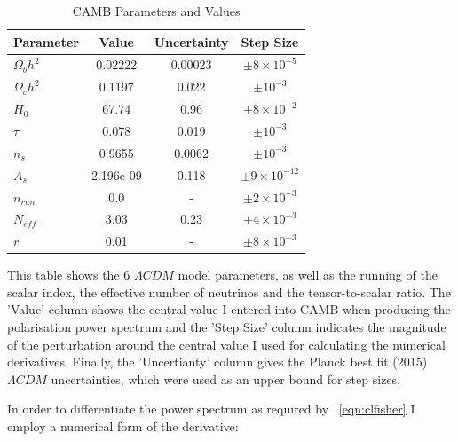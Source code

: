 \begin{table}[h]
\centering
\caption{CAMB Parameters and Values}
\label{table:camb}
\begin{tabular}{l|l|l|l}
Parameter & \multicolumn{1}{c|}{Value} & Uncertainty & Step Size \\ \hline
$\Omega_{b}h^{2}$ & \multicolumn{1}{c|}{0.02222} & \multicolumn{1}{c|}{0.00023} & \multicolumn{1}{c}{$\pm 8 \times 10^{-5}$}  \\
$\Omega_{c}h^{2}$ & \multicolumn{1}{c|}{0.1197} & \multicolumn{1}{c|}{0.022} & \multicolumn{1}{c}{$\pm 10^{-3}$}  \\
$H_0$ & \multicolumn{1}{c|}{67.74} & \multicolumn{1}{c|}{0.96} & \multicolumn{1}{c}{$\pm 8 \times 10^{-2}$}  \\
$\tau$ & \multicolumn{1}{c|}{0.078} & \multicolumn{1}{c|}{0.019} & \multicolumn{1}{c}{$\pm 10^{-3}$}  \\
$n_s$ & \multicolumn{1}{c|}{0.9655} & \multicolumn{1}{c|}{0.0062} & \multicolumn{1}{c}{$\pm 10^{-3}$}  \\
$A_s$ & \multicolumn{1}{c|}{2.196e-09} & \multicolumn{1}{c|}{0.118} & \multicolumn{1}{c}{$\pm 9 \times 10^{-12}$}  \\
$n_{run}$ & \multicolumn{1}{c|}{0.0} & \multicolumn{1}{c|}{-} & \multicolumn{1}{c}{$\pm 2 \times 10^{-3}$}  \\
$N_{eff}$ & \multicolumn{1}{c|}{3.03} & \multicolumn{1}{c|}{0.23} & \multicolumn{1}{c}{$\pm 4 \times 10^{-3}$}  \\
$r$ & \multicolumn{1}{c|}{0.01} & \multicolumn{1}{c|}{-} & \multicolumn{1}{c}{$\pm 8 \times 10^{-3}$} 
\end{tabular}

\bigskip
\begin{flushleft}
This table shows the 6 $\Lambda CDM$ model parameters, as well as the running of the scalar index, the effective number of neutrinos and the tensor-to-scalar ratio. The 'Value' column shows the central value I entered into CAMB when producing the polarisation power spectrum and the 'Step Size' column indicates the magnitude of the perturbation around the central value I used for calculating the numerical derivatives. Finally, the 'Uncertianty' column gives the Planck best fit (2015) \cite{Ade:2015xua} $\Lambda CDM$ uncertainties, which were used as an upper bound for step sizes.
\end{flushleft}
\end{table}
 

In order to differentiate the power spectrum as required by ~\ref{eqn:clfisher} I employ a numerical form of the derivative:

